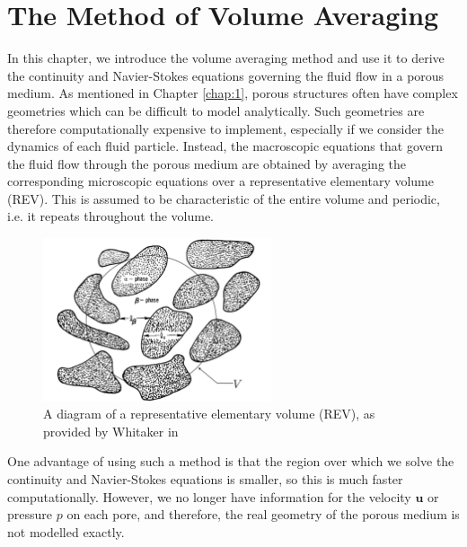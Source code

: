 \documentclass[a4paper, 11pt]{report}
\begin{document}

\chapter{The Method of Volume Averaging} \label{chap:2}

In this chapter, we introduce the volume averaging method and use it to derive the continuity and Navier-Stokes equations governing the fluid flow in a porous medium. As mentioned in Chapter \ref{chap:1}, porous structures often have complex geometries which can be difficult to model analytically. Such geometries are therefore computationally expensive to implement, especially if we consider the dynamics of each fluid particle. Instead, the macroscopic equations that govern the fluid flow through the porous medium are obtained by averaging the corresponding microscopic equations over a representative elementary volume (REV). This is assumed to be characteristic of the entire volume and periodic, i.e. it repeats throughout the volume.

\begin{figure}[!htb]
    \centering
    \includegraphics[width=0.6\textwidth]{figures/rev.png}
    \caption[A diagram of the REV]{A diagram of a representative elementary volume (REV), as provided by Whitaker in \cite{whitakerdarcy}}
    \label{fig:rev}
\end{figure}

One advantage of using such a method is that the region over which we solve the continuity and Navier-Stokes equations is smaller, so this is much faster computationally. 
However, we no longer have information for the velocity $\mathbf{u}$ or pressure $p$ on each pore, and therefore, the real geometry of the porous medium is not modelled exactly.
\end{document}
